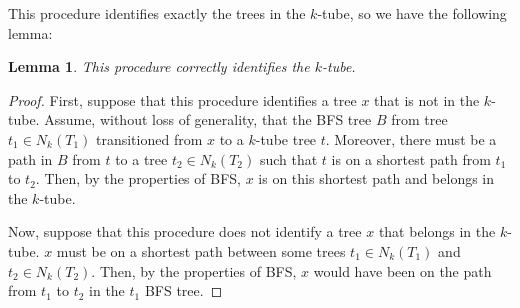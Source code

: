 \documentclass{amsart}
\newtheorem{lemma}[theorem]{Lemma}
\begin{document}
This procedure identifies exactly the trees in the $k$-tube, so we have the following lemma:
\begin{lemma}
	\label{lem:k_tube_correctness}
	This procedure correctly identifies the $k$-tube.
\end{lemma}
\begin{proof}
	First, suppose that this procedure identifies a tree $x$ that is not in the $k$-tube.
	Assume, without loss of generality, that the BFS tree $B$ from tree $t_1 \in N_k(T_1)$ transitioned from $x$ to a $k$-tube tree $t$.
	Moreover, there must be a path in $B$ from $t$ to a tree $t_2 \in N_k(T_2)$ such that $t$ is on a shortest path from $t_1$ to $t_2$.
	Then, by the properties of BFS, $x$ is on this shortest path and belongs in the $k$-tube.

	Now, suppose that this procedure does not identify a tree $x$ that belongs in the $k$-tube.
	$x$ must be on a shortest path between some trees $t_1 \in N_k(T_1)$ and $t_2 \in N_k(T_2)$.
	Then, by the properties of BFS, $x$ would have been on the path from $t_1$ to $t_2$ in the $t_1$ BFS tree.
\end{proof}

% 
% 
\end{document}
